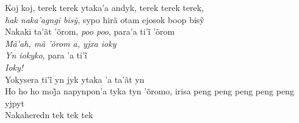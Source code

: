 \begin{linenumbers}\begingroup\raggedright

\noindent   Koj koj, terek terek ytaka'a andyk, terek terek terek,\\
  \emph{hak naka’agngi bisỹ}, sypo hirã otam ejosok boop bisỹ\\
  Nakaki ta’ãt ’õrom, \emph{poo poo}, para’a ti’ĩ ’õrom\\
  \emph{Mã'ah, mã 'õrom a, yjxa ioky}\\
  \emph{Yn iokyko}, para ’a ti’ĩ\\
  \emph{Ioky!}\\
  Yokysera ti’ĩ yn jyk ytaka ’a ta’ãt yn\\
  Ho ho ho moj̃a napynpon’a tyka tyn ’õromo, irisa peng peng peng peng peng yjpyt\\
  Nakaheredn tek tek tek

\end{linenumbers}\endgroup

\bigskip

